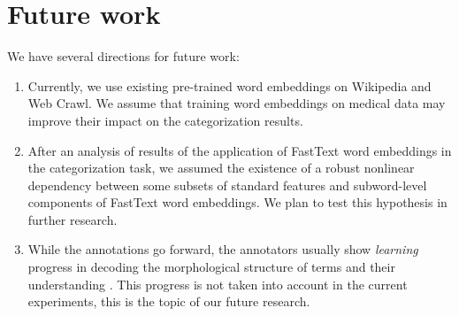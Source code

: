 \section{Future work}
We have several directions for future work:
\begin{enumerate}
    \item Currently, we use existing pre-trained word embeddings on Wikipedia and Web Crawl. We assume that training word embeddings on medical data may improve their impact on the categorization results.
    
    \item After an analysis of results of the application of FastText word embeddings in the categorization task, we assumed the existence of a robust nonlinear dependency between some subsets of standard features and subword-level components of FastText word embeddings. We plan to test this hypothesis in further research.
    
    \item While the annotations go forward, the annotators usually show {\it learning} progress in decoding the morphological structure of terms and their understanding \citep{Grabar-BIONLP2017}. This progress is not taken into account in the current experiments, this is the topic of our future research. 
\end{enumerate}
